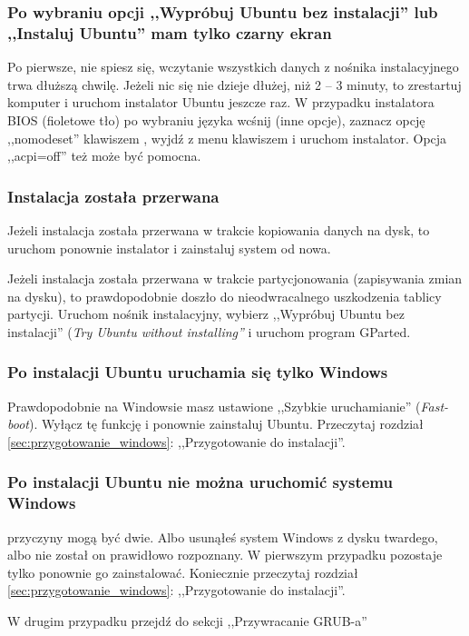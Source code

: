 \subsubsection{Po wybraniu opcji ,,Wypróbuj Ubuntu bez instalacji'' lub ,,Instaluj Ubuntu'' mam tylko czarny ekran}
Po pierwsze, nie spiesz się, wczytanie wszystkich danych z nośnika instalacyjnego trwa dłuższą chwilę. Jeżeli nic się nie dzieje dłużej, niż 2 -- 3 minuty, to zrestartuj komputer i uruchom instalator Ubuntu jeszcze raz. W przypadku instalatora BIOS (fioletowe tło) po wybraniu języka wcśnij  (inne opcje), zaznacz opcję ,,nomodeset'' klawiszem \keys{\returnwin}, wyjdź z menu klawiszem  i uruchom instalator. Opcja ,,acpi=off'' też może być pomocna.

\subsubsection{Instalacja została przerwana}
Jeżeli instalacja została przerwana w trakcie kopiowania danych na dysk, to uruchom ponownie instalator i zainstaluj system od nowa.

Jeżeli instalacja została przerwana w trakcie partycjonowania (zapisywania zmian na dysku), to prawdopodobnie doszło do nieodwracalnego uszkodzenia tablicy partycji. Uruchom nośnik instalacyjny, wybierz ,,Wypróbuj Ubuntu bez instalacji'' (\textit{Try Ubuntu without installing''} i uruchom program GParted.

\subsubsection{Po instalacji Ubuntu uruchamia się tylko Windows}
Prawdopodobnie na Windowsie masz ustawione ,,Szybkie uruchamianie'' (\textit{Fast-boot}). Wyłącz tę funkcję i ponownie zainstaluj Ubuntu. Przeczytaj rozdział \ref{sec:przygotowanie_windows}: ,,Przygotowanie do instalacji''.

\subsubsection{Po instalacji Ubuntu nie można uruchomić systemu Windows}
przyczyny mogą być dwie. Albo usunąłeś system Windows z dysku twardego, albo nie został on prawidłowo rozpoznany. W pierwszym przypadku pozostaje tylko ponownie go zainstalować. Koniecznie przeczytaj rozdział \ref{sec:przygotowanie_windows}: ,,Przygotowanie do instalacji''.

W drugim przypadku przejdź do sekcji ,,Przywracanie GRUB-a''

